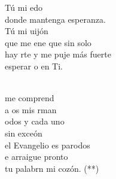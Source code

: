 \begin{cancion}
	 Tú mi edo \\
	donde mantenga  esperanza.\\
	 Tú mi uijón\\
	que me ene que sin solo \\
	hay rte y me puje más fuerte\\
	esperar o en Ti. \\\jump\\
	\begin{chorus}%
	me comprend \\
	a os mis rman  \\
	odos y cada uno\\
	sin exceón  \\
	el Evangelio es parodos\\
	e arraigue pronto\\
	tu palabrn mi cozón. (**)\\
	\end{chorus}%
	\jump\\
\end{cancion}%
